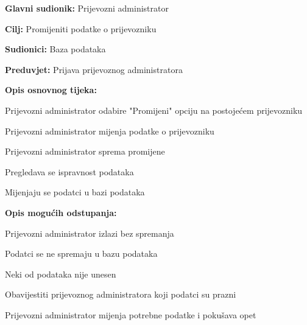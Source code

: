 			\noindent {}
			\begin{packed_item}
				
				\item \textbf{Glavni sudionik: }Prijevozni administrator
				\item  \textbf{Cilj:} Promijeniti podatke o prijevozniku
				\item  \textbf{Sudionici:} Baza podataka
				\item  \textbf{Preduvjet:} Prijava prijevoznog administratora
				\item  \textbf{Opis osnovnog tijeka:}
				
				\item[] \begin{packed_enum}
					
					\item Prijevozni administrator odabire "Promijeni" opciju na postojećem prijevozniku
					\item Prijevozni administrator mijenja podatke o prijevozniku
					\item Prijevozni administrator sprema promijene
					\item Pregledava se ispravnost podataka
					\item Mijenjaju se podatci u bazi podataka
				\end{packed_enum}
				
				\item  \textbf{Opis mogućih odstupanja:}
				
				\item[] \begin{packed_item}
					
					\item[3.a] Prijevozni administrator izlazi bez spremanja
					\item[] \begin{packed_enum}
						
						\item Podatci se ne spremaju u bazu podataka
						
					\end{packed_enum}
					
					\item[4.a] Neki od podataka nije unesen
					\item[] \begin{packed_enum}
						
						\item Obavijestiti prijevoznog administratora koji podatci su prazni
						\item Prijevozni administrator mijenja potrebne podatke i pokušava opet
						
					\end{packed_enum}
					
				\end{packed_item}
			\end{packed_item}
			
